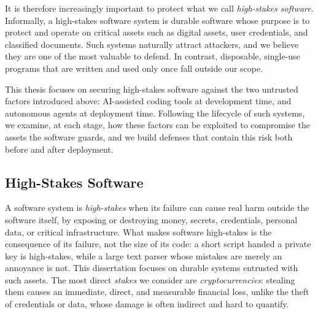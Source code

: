 It is therefore increasingly important to protect what we call
\emph{high-stakes software}. Informally, a high-stakes software
system is durable software whose purpose is to protect
and operate on critical assets such as digital assets,
user credentials, and classified documents.
Such systems naturally
attract attackers, and we believe they
are one of the most valuable to
defend. In contrast, disposable, single-use programs that are written
and used only
once fall outside our scope.

This thesis focuses on securing high-stakes software against the
two untrusted factors introduced above: AI-assisted coding tools at
development time, and autonomous agents at deployment time. 
Following the
lifecycle of such systems, we examine, at each stage, how these factors
can be exploited to compromise the assets the software guards, and we
build defenses that contain this risk both before and after
deployment.



\subsection{High-Stakes Software}
\label{subsec:high-stakes-software}

A software system is \emph{high-stakes} when its failure can cause real
harm outside the software itself, by exposing or destroying money, secrets,
credentials, personal data, or critical infrastructure. What makes software
high-stakes is the consequence of its failure, 
not the size of its code: a short
script handed a private key is high-stakes, while 
a large text parser whose
mistakes are merely an annoyance is not. 
This dissertation focuses on durable
systems entrusted with such assets. 
The most direct \emph{stakes} we
consider are \emph{cryptocurrencies}: stealing them
causes an immediate, direct,
and
measurable financial loss, unlike the theft of credentials or data,
whose damage is often indirect and hard to quantify.



